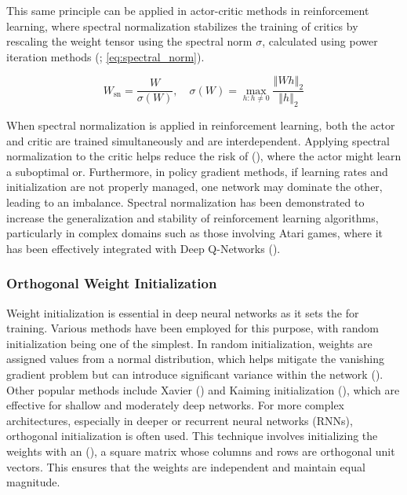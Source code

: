         \bigskip
        
        \noindent  This same principle can be applied in actor-critic methods in reinforcement learning, where spectral normalization stabilizes the training of critics by rescaling the weight tensor using the spectral norm $\sigma$, calculated using power iteration methods (\textcolor{deepblue}{\cite{pytorch2}; \autoref{eq:spectral_norm}}). 
        
        \begin{equation}
            W_{\text{sn}} = \frac{W}{\sigma(W)}, \quad \sigma(W) = \underset{h: h \neq 0}{\max}\frac{\left\Vert W h \right\Vert_2}{\left\Vert h \right\Vert_2}
            \label{eq:spectral_norm}
        \end{equation}
        
        \noindent When spectral normalization is applied in reinforcement learning, both the actor and critic are trained simultaneously and are interdependent. Applying spectral normalization to the critic helps reduce the risk of (\cite{dohare2023overcoming}), where the actor might learn a suboptimal or. Furthermore, in policy gradient methods, if learning rates and initialization are not properly managed, one network may dominate the other, leading to an imbalance. Spectral normalization has been demonstrated to increase the generalization and stability of reinforcement learning algorithms, particularly in complex domains such as those involving Atari games, where it has been effectively integrated with Deep Q-Networks (\cite{gogianu2021spectral}).

    \subsubsection{Orthogonal Weight Initialization}
    \label{subsec:ortho}
        
        \noindent Weight initialization is essential in deep neural networks as it sets the for training. Various methods have been employed for this purpose, with random initialization being one of the simplest. In random initialization, weights are assigned values from a normal distribution, which helps mitigate the vanishing gradient problem but can introduce significant variance within the network (\cite{hu2020provable}). Other popular methods include Xavier (\cite{kumar2017weight}) and Kaiming initialization (\cite{he2015delving}), which are effective for shallow and moderately deep networks. For more complex architectures, especially in deeper or recurrent neural networks (RNNs), orthogonal initialization is often used. This technique involves initializing the weights with an  (\cite{wiki:Orthogonal_matrix}), a square matrix whose columns and rows are orthogonal unit vectors. This ensures that the weights are independent and maintain equal magnitude.
        
